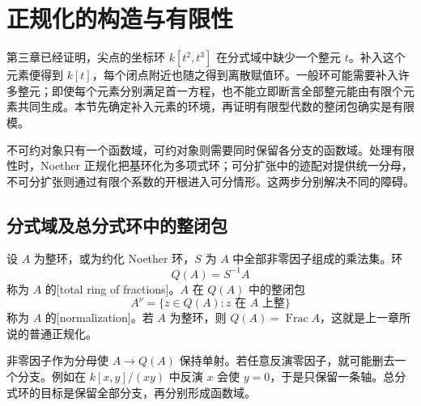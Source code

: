 
% 
% 
% 
% 

\section{正规化的构造与有限性}
\label{g5:sec:0402}

第三章已经证明，尖点的坐标环 \(k[t^2,t^3]\) 在分式域中缺少一个整元 \(t\)。补入这个元素便得到 \(k[t]\)，每个闭点附近也随之得到离散赋值环。一般环可能需要补入许多整元；即使每个元素分别满足首一方程，也不能立即断言全部整元能由有限个元素共同生成。本节先确定补入元素的环境，再证明有限型代数的整闭包确实是有限模。

\ProseParagraphBreak

不可约对象只有一个函数域，可约对象则需要同时保留各分支的函数域。处理有限性时，Noether 正规化把基环化为多项式环；可分扩张中的迹配对提供统一分母，不可分扩张则通过有限个系数的开根进入可分情形。这两步分别解决不同的障碍。

\subsection{分式域及总分式环中的整闭包}
\label{g5:subsec:0402:01}

\begin{definition}\label{g5:def:normalization-ring}
	设 \(A\) 为整环，或为约化 Noether 环，\(S\) 为 \(A\) 中全部非零因子组成的乘法集。环
	\[
		Q(A)=S^{-1}A
	\]
	称为 \(A\) 的[total ring of fractions]。\(A\) 在 \(Q(A)\) 中的整闭包
	\[
		A^\nu=\{z\in Q(A):z\text{ 在 }A\text{ 上整}\}
	\]
	称为 \(A\) 的[normalization]。若 \(A\) 为整环，则 \(Q(A)=\operatorname{Frac}A\)，这就是上一章所说的普通正规化。
\end{definition}

非零因子作为分母使 \(A\to Q(A)\) 保持单射。若任意反演零因子，就可能删去一个分支。例如在 \(k[x,y]/(xy)\) 中反演 \(x\) 会使 \(y=0\)，于是只保留一条轴。总分式环的目标是保留全部分支，再分别形成函数域。


